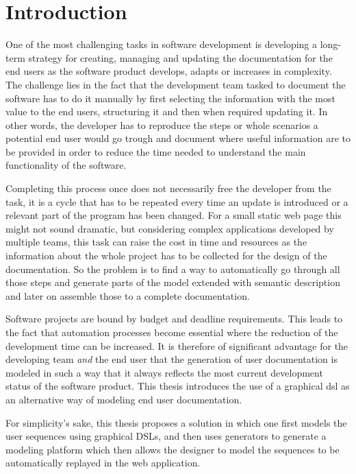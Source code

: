 \chapter{Introduction}\label{ch:intro}

One of the most challenging tasks in software development is developing a long-term strategy for creating, managing and updating the documentation for the end users as the software product develops, adapts or increases in complexity. The challenge lies in the fact that the development team tasked to document the software has to do it manually by first selecting the information with the most value to the end users, structuring it and then when required updating it. In other words, the developer has to reproduce the steps or whole scenarios a potential end user would go trough and document where useful information are to be provided in order to reduce the time needed to understand the main functionality of the software. 

Completing this process once does not necessarily free the developer from the task, it is a cycle that has to be repeated every time an update is introduced or a relevant part of the program has been changed. For a small static web page this might not sound dramatic, but considering complex applications developed by multiple teams, this task can raise the cost in time and resources as the information about the whole project has to be collected for the design of the documentation\cite{IEEE}. So the problem is to find a way to automatically go through all those steps and generate parts of the model extended with semantic description and later on assemble those to a complete documentation.

Software projects are bound by budget and deadline requirements. This leads to the fact that automation processes become essential where the reduction of the development time can be increased. It is therefore of significant advantage for the developing team \textit{and} the end user that the generation of user documentation is modeled in such a way that it always reflects the most current development status of the software product. This thesis introduces the use of a graphical \acrfull{dsl} as an alternative way of modeling end user documentation.

For simplicity's sake, this thesis proposes a solution in which one first models the user sequences using graphical DSLs, and then uses generators to generate a modeling platform which then allows the designer to model the sequences to be automatically replayed in the web application.

